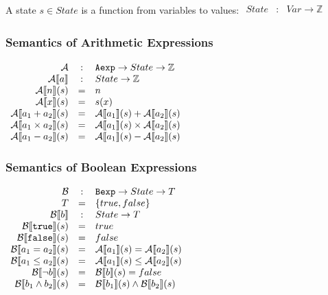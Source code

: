 A state $ s \in State $ is a function from variables to values:
\begin{math}
  \begin{array}{rcl}
    State & : & Var \to \mathbb{Z} \\
  \end{array}
\end{math}


\subsubsection{Semantics of Arithmetic Expressions}

\begin{math}
  \begin{array}{rcl}
    \mathcal{A} & : & \mathtt{Aexp} \to State \to \mathbb{Z} \\
    \mathcal{A} \llbracket  a  \rrbracket & : & State \to \mathbb{Z} \\
    \mathcal{A} \llbracket  n  \rrbracket (s) & = & n \\
    \mathcal{A} \llbracket  x  \rrbracket (s) & = & s(x) \\
    \mathcal{A} \llbracket  a_1 + a_2  \rrbracket (s) & = & \mathcal{A} \llbracket  a_1  \rrbracket (s) + \mathcal{A} \llbracket  a_2  \rrbracket (s) \\
    \mathcal{A} \llbracket  a_1 \times a_2  \rrbracket (s) & = & \mathcal{A} \llbracket  a_1  \rrbracket (s) \times \mathcal{A} \llbracket  a_2  \rrbracket (s) \\
    \mathcal{A} \llbracket  a_1 - a_2  \rrbracket (s) & = & \mathcal{A} \llbracket  a_1  \rrbracket (s) - \mathcal{A} \llbracket  a_2  \rrbracket (s) \\
  \end{array}
\end{math}

\subsubsection{Semantics of Boolean Expressions}

\begin{math}
  \begin{array}{rcl}
    \mathcal{B} & : & \mathtt{Bexp} \to State \to {T} \\
    {T} & = & \{ {true}, {false} \} \\
    \mathcal{B} \llbracket  b  \rrbracket & : & State \to {T} \\
    \mathcal{B} \llbracket  \mathtt{true}  \rrbracket (s) & = & {true} \\
    \mathcal{B} \llbracket  \mathtt{false}  \rrbracket (s) & = & {false} \\
    \mathcal{B} \llbracket  a_1 = a_2  \rrbracket (s) & = & \mathcal{A} \llbracket  a_1  \rrbracket (s) = \mathcal{A} \llbracket  a_2  \rrbracket (s) \\
    \mathcal{B} \llbracket  a_1 \leq a_2  \rrbracket (s) & = & \mathcal{A} \llbracket  a_1  \rrbracket (s) \leq \mathcal{A} \llbracket  a_2  \rrbracket (s) \\
    \mathcal{B} \llbracket  \neg b  \rrbracket (s) & = & \mathcal{B} \llbracket  b  \rrbracket (s) = {false} \\
    \mathcal{B} \llbracket  b_1 \land b_2  \rrbracket (s) & = & \mathcal{B} \llbracket  b_1  \rrbracket (s) \wedge \mathcal{B} \llbracket  b_2  \rrbracket (s) \\
  \end{array}
\end{math}

